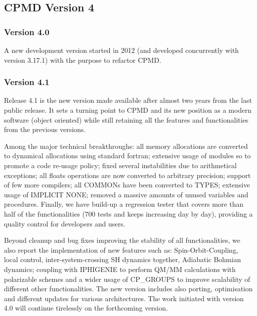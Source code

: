 \documentclass[twoside,10pt,titlepage,a4paper]{article}
\begin{document}
\subsection{CPMD Version 4}

\subsubsection{Version 4.0}
%
A new development version started in 2012 (and developed concurrently with
version 3.17.1) with the purpose to refactor CPMD.


\subsubsection{Version 4.1} 
%
Release 4.1 is the new version made available after almost two years from the
last public release.
%
It sets a turning point to CPMD and its new position as a modern software
(object oriented) while still retaining all the features and functionalities
from the previous versions.


Among the major technical breakthroughs: all memory allocations are converted
to dynamical allocations using standard fortran; extensive usage of modules so
to promote a code re-usage policy; fixed several instabilities due to
arithmetical exceptions;  all floats operations are now converted to arbitrary
precision; support of few more compilers; all COMMONs have been converted to
TYPES; extensive usage of IMPLICIT NONE; removed a massive amounts of unused
variables and procedures. Finally, we have build-up a regression tester that
covers more than half of the functionalities (700 tests and keeps increasing
day by day), providing a quality control for developers and users.


Beyond cleanup and bug fixes improving the stability of all functionalities, we
also report the implementation of new features such as: Spin-Orbit-Coupling,
local control, inter-system-crossing SH dynamics together, Adiabatic Bohmian
dynamics; coupling with IPHIGENIE to perform QM/MM calculations with
polarizable schemes and a wider usage of CP\_GROUPS to improve scalability of
different other functionalities.  The new version includes also porting,
optimisation and different updates for various architectures. The work
initiated with version 4.0 will continue tirelessly on the forthcoming version.
\end{document}
